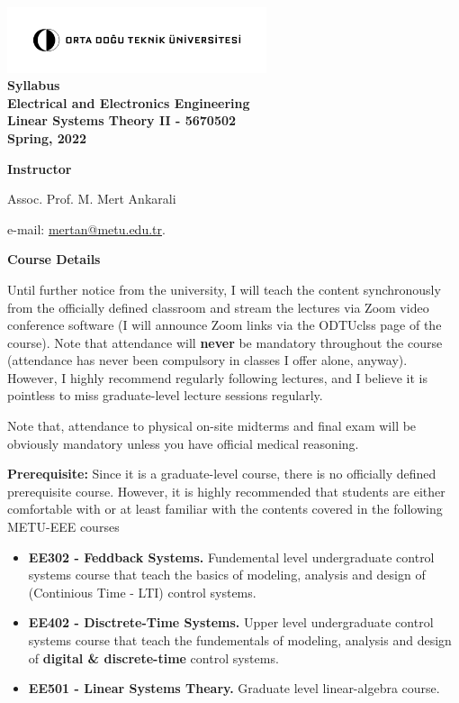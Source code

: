 \documentclass[11pt,oneside]{amsart}
\newcommand{\header}[1]{\bigbreak\textbf{#1}}
\begin{document}
\begin{center}
  \bf
  \includegraphics[width=3in]{metu_logo} \\
  Syllabus \\
 Electrical and Electronics Engineering \\ 
Linear Systems Theory II - 5670502 \\
Spring, 2022
\end{center}

\header{Instructor} 

\vspace{4pt}

Assoc. Prof. M. Mert Ankarali

e-mail: \url{mertan@metu.edu.tr}.

\header{Course Details}

\vspace{6pt}

Until further notice from the university, I will teach the content
synchronously from the officially defined classroom and stream the
lectures via Zoom video conference software (I will announce Zoom
links via the ODTUclss page of the course). Note that attendance will
\textbf{never} be mandatory throughout the course (attendance has
never been compulsory in classes I offer alone, anyway). However,  I
highly recommend regularly following lectures, and I believe it is
pointless to miss graduate-level lecture sessions regularly. 

\vspace{3pt}

Note that, attendance to physical on-site midterms and final exam will
be obviously mandatory unless you have official medical reasoning. 

\vspace{6pt}

\textbf{Prerequisite:} Since it is a graduate-level course, there is no officially defined prerequisite course. However, it is highly recommended that students are either comfortable with or at least familiar with the contents covered in the following METU-EEE courses


\begin{itemize}
  \item \textbf{EE302 - Feddback Systems.} Fundemental level undergraduate control
    systems course that teach the basics of modeling, analysis
    and design of (Continious Time - LTI) control systems. 
   \item \textbf{EE402 - Disctrete-Time Systems.} Upper level undergraduate control
    systems course that teach the fundementals of modeling, analysis
    and design of \textbf{digital \& discrete-time} control systems. 
   \item \textbf{EE501 - Linear Systems Theary.} Graduate 
    level linear-algebra course.
\end{itemize}
\end{document}
